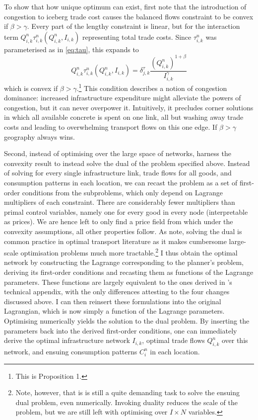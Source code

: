 \documentclass[11pt, oneside]{article}   	%
\begin{document}
To show that how unique optimum can exist, first note that the introduction of congestion to iceberg trade cost causes the balanced flows constraint to be convex if $\beta > \gamma$. Every part of the lengthy constraint is linear, but for the interaction term  $Q_{i,k}^{n}\tau_{i,k}^{n}(Q_{i,k}^{n}, I_{i,k})$ representing total trade costs. Since $\tau_{i,k}^{n}$ was parameterised as in \eqref{eq:tau}, this expands to
\begin{equation}
  Q_{i,k}^{n}\tau_{i,k}^{n}(Q_{i,k}^{n}, I_{i,k}) = \delta^{\tau}_{j, k} \frac{(Q_{i,k}^{n})^{1+\beta}}{I_{i,k}^{\gamma}}
\end{equation}
which is convex if $\beta > \gamma$.\footnote{This is \citeauthor{fajgelbaum_optimal_2017} Proposition 1.} This condition describes a notion of congestion dominance: increased infrastructure expenditure might alleviate the powers of congestion, but it can never overpower it. Intuitively, it precludes corner solutions in which all available concrete is spent on one link, all but washing away trade costs and leading to overwhelming transport flows on this one edge. If $\beta > \gamma$ geography always wins.

Second, instead of optimising over the large space of networks, \citeauthor{fajgelbaum_optimal_2017} harness the convexity result to instead solve the dual of the problem specified above. Instead of solving for every single infrastructure link, trade flows for all goods, and consumption patterns in each location, we can recast the problem as a set of first-order conditions from the subproblems, which only depend on Lagrange multipliers of each constraint. There are considerably fewer multipliers than primal control variables, namely one for every good in every node (interpretable as prices). We are hence left to only find a price field from which under the convexity assumptions, all other properties follow. As \citeauthor{fajgelbaum_optimal_2017} note, solving the dual is common practice in optimal transport literature as it makes cumbersome large-scale optimisation problems much more tractable.\footnote{Note, however, that is is still a quite demanding  task to solve the ensuing dual problem, even numerically. Invoking duality reduces the scale of the problem, but we are still left with optimising over $I \times N$ variables.} I thus obtain the optimal network by constructing the Lagrange corresponding to the planner's problem, deriving its first-order conditions and recasting them as functions of the Lagrange parameters. These functions are largely equivalent to the ones derived in \citeauthor{fajgelbaum_optimal_2017}'s technical appendix, with the only differences attesting to the four changes discussed above. I can then reinsert these formulations into the original Lagrangian, which is now simply a function of the Lagrange parameters. Optimising numerically yields the solution to the dual problem. By inserting the parameters back into the derived first-order conditions, one can immediately derive the optimal infrastructure network $I_{i,k}$, optimal trade flows $Q_{i,k}^{n}$ over this network, and ensuing consumption patterns $C_{i}^{n}$ in each location.
\end{document}
